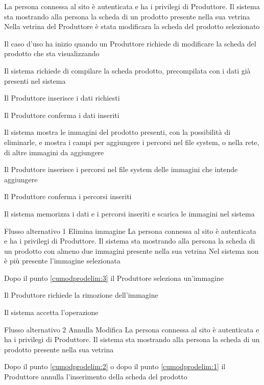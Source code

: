 
{}
{La persona connessa al sito è autenticata e ha i privilegi di Produttore. Il sistema sta mostrando alla persona la scheda di un prodotto presente nella sua vetrina}%
{Nella vetrina del Produttore è stata modificara la scheda del prodotto selezionato}
{\begin{enumCU}
		\item Il caso d'uso ha inizio quando un Produttore richiede di modificare la scheda del prodotto che sta visualizzando
		\item Il sistema richiede di compilare la scheda prodotto, precompilata con i dati già presenti nel sistema
		\item Il Produttore inserisce i dati richiesti\label{cumodprodelim:1}
		\item Il Produttore conferma i dati inseriti
		\item Il sistema mostra le immagini del prodotto presenti, con la possibilità di eliminarle, e mostra i campi per aggiungere i percorsi nel file system, o nella rete, di altre immagini da aggiungere\label{cumodprodelim:3}
		\item Il Produttore inserisce i percorsi nel file system delle immagini che intende aggiungere
		\item Il Produttore conferma i percorsi inseriti\label{cumodprodelim:2}
		\item Il sistema memorizza i dati e i percorsi inseriti e scarica le immagini nel sistema
	\end{enumCU}} %
%
{Flusso alternativo 1}%
{Elimina immagine}%
{La persona connessa al sito è autenticata e ha i privilegi di Produttore. Il sistema sta mostrando alla persona la scheda di un prodotto con almeno due immagini presente nella sua vetrina}
{Nel sistema non è più presente l'immagine selezionata}%
{\begin{enumCU}
		\item Dopo il punto \ref{cumodprodelim:3} il Produttore seleziona un'immagine
		\item Il Produttore richiede la rimozione dell'immagine
		\item Il sistema accetta l'operazione
	\end{enumCU}}%
%
{Flusso alternativo 2}%
{Annulla Modifica}%
{La persona connessa al sito è autenticata e ha i privilegi di Produttore. Il sistema sta mostrando alla persona la scheda di un prodotto presente nella sua vetrina}%
{\postNulle}%
{\begin{enumCU}
		\item Dopo il punto \ref{cumodprodelim:2} o dopo il punto \ref{cumodprodelim:1} il Produttore annulla l'inserimento della scheda del prodotto
	\end{enumCU}}%

